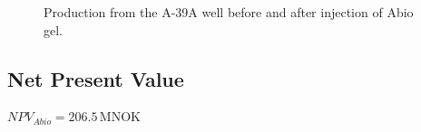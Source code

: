 \documentclass[final]{beamer}
\begin{document}
\begin{frame}
\begin{multicols}{3}
\begin{figure}[H]
  \centering
  
  \caption{Production from the A-39A well before and after injection of Abio gel.}
  \label{fig:abio_change}
\end{figure}

\subsection{Net Present Value}
\begin{center}
  $NPV_{Abio} = 206.5 \, \mathrm{MNOK}$
\end{center}




\end{multicols}

\end{frame}
\end{document}
